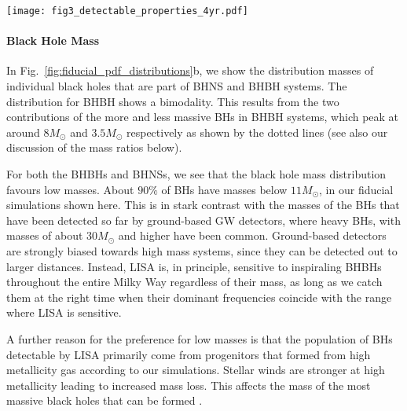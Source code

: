 \begin{figure*}[t]
    \centering
    \texttt{[image: fig3\_detectable\_properties\_4yr.pdf]}
    \caption{Properties of detectable systems for a 4-year LISA mission in our fiducial model. Each panel shows a kernel density estimator for a single property, coloured by DCO type. The shaded areas show the 1- and 2-$\sigma$ uncertainties (obtained via bootstrapping). The dotted lines in the black hole mass panel show the individual primary and secondary mass distributions. See Sec.~\ref{sec:fiducial_distributions} for a discussion. \href{https://github.com/TomWagg/detecting-DCOs-in-LISA/blob/main/paper/figures/fig3_detectable_properties_4yr.pdf}{\faFileImage} \href{https://github.com/TomWagg/detecting-DCOs-in-LISA/blob/main/paper/figure_notebooks/fiducial.ipynb}{\faBook}.}
    \label{fig:fiducial_pdf_distributions}
\end{figure*}

\paragraph{Black Hole Mass}
In Fig.~\ref{fig:fiducial_pdf_distributions}b, we show the distribution masses of individual black holes that are part of BHNS and BHBH systems. 
The distribution for BHBH shows a bimodality. This results from the two contributions of the more and less massive BHs in BHBH systems, which peak at around $8 \unit{M_{\odot}}$ and $3.5 \unit{M_{\odot}}$ respectively as shown by the dotted lines (see also our discussion of the mass ratios below).

For both the BHBHs and BHNSs, we see that the black hole mass distribution favours low masses. About $90\%$ of BHs have masses below $11 \unit{M_{\odot}}$, in our fiducial simulations shown here. This is in stark contrast with the masses of the BHs that have been detected so far by ground-based GW detectors, where heavy BHs, with masses of about $30\unit{M_{\odot}}$ and higher have been common. Ground-based detectors are strongly biased towards high mass systems, since they can be detected out to larger distances. Instead, LISA is, in principle, sensitive to inspiraling BHBHs throughout the entire Milky Way regardless of their mass, as long as we catch them at the right time when their dominant frequencies coincide with the range where LISA is sensitive.

A further reason for the preference for low masses is that the population of BHs detectable by LISA primarily come from progenitors that formed from high metallicity gas according to our simulations. Stellar winds are stronger at high metallicity leading to increased mass loss. This affects the mass of the most massive black holes that can be formed \citep{Belczynski+2010}. 

